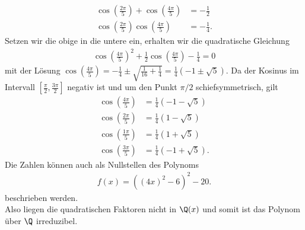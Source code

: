 \begin{solution}
  \begin{align*}
    \cos\left(\frac{2\pi}{5}\right) + \cos\left(\frac{4\pi}{5}\right) &= -\frac{1}{2} \\
    \cos\left(\frac{2\pi}{5}\right)\cos\left(\frac{4\pi}{5}\right) &= -\frac{1}{4}.
  \end{align*}
  Setzen wir die obige in die untere ein, erhalten wir die quadratische Gleichung
  \begin{align*}
    \cos\left(\frac{4\pi}{5}\right)^2 + \frac{1}{2}\cos\left(\frac{4\pi}{5}\right) - \frac{1}{4} = 0
  \end{align*}
  mit der Lösung $\cos\left(\frac{4\pi}{5}\right) = -\frac{1}{4} \pm \sqrt{\frac{1}{16} + \frac{1}{4}} = \frac{1}{4}(-1\pm\sqrt{5})$.
  Da der Kosinus im Intervall $[\frac{\pi}{2},\frac{3\pi}{2}]$ negativ ist
  und um den Punkt $\pi/2$ schiefsymmetrisch, gilt
  \begin{align*}
    \cos\left(\frac{4\pi}{5}\right) &= \frac{1}{4}(-1-\sqrt{5}) \\
    \cos\left(\frac{2\pi}{5}\right) &= \frac{1}{4}(1-\sqrt{5}) \\
    \cos\left(\frac{1\pi}{5}\right) &= \frac{1}{4}(1+\sqrt{5}) \\
    \cos\left(\frac{3\pi}{5}\right) &= \frac{1}{4}(-1+\sqrt{5}).
  \end{align*}
  Die Zahlen können auch als Nullstellen des Polynoms
  \begin{align*}
    f(x) = ((4x)^2 - 6)^2 - 20.
  \end{align*}
  beschrieben werden. \\
  Also liegen die quadratischen Faktoren nicht in $\Q(x)$ und somit ist das Polynom über $\Q$ irreduzibel.

\end{solution}
